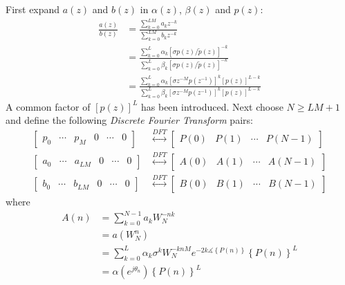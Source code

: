 \documentclass[a4paper,twoside,10pt,english]{report}
\begin{document}
First expand $a\left(z\right)$ and $b\left(z\right)$ in $\alpha\left(z\right)$,
$\beta\left(z\right)$ and $p\left(z\right)$:
\begin{align*}
\frac{a\left(z\right)}{b\left(z\right)} &= \frac{\sum_{k=0}^{LM}a_{k}z^{-k}}{\sum_{k=0}^{LM}b_{k}z^{-k}}\\
 &= \frac{\sum_{k=0}^{L}\alpha_{k}\left[\sigma p\left(z\right)/\tilde{p}\left(z\right)\right]^{-k}}{\sum_{k=0}^{L}\beta_{k}\left[\sigma p\left(z\right)/\tilde{p}\left(z\right)\right]^{-k}}\\
 &= \frac{\sum_{k=0}^{L}\alpha_{k}\left[\sigma z^{-M}p\left(z^{-1}\right)\right]^{k}\left[p\left(z\right)\right]^{L-k}}{\sum_{k=0}^{L}\beta_{k}\left[\sigma z^{-M}p\left(z^{-1}\right)\right]^{k}\left[p\left(z\right)\right]^{L-k}}
\end{align*}
A common factor of $\left[p\left(z\right)\right]^{L}$ has been introduced.
Next choose $N\geq LM+1$ and define the following 
\emph{Discrete Fourier Transform} pairs:
\begin{align*}
\left[\begin{array}{cccccc}
p_{0} & \cdots & p_{M} & 0 & \cdots & 0\end{array}\right] 
& \overset{DFT}{\longleftrightarrow}  \left[\begin{array}{cccc}
P\left(0\right) & P\left(1\right) & \cdots & P\left(N-1\right)\end{array}\right]\\
\left[\begin{array}{cccccc}
a_{0} & \cdots & a_{LM} & 0 & \cdots & 0\end{array}\right] 
& \overset{DFT}{\longleftrightarrow} \left[\begin{array}{cccc}
A\left(0\right) & A\left(1\right) & \cdots & A\left(N-1\right)\end{array}\right]\\
\left[\begin{array}{cccccc}
b_{0} & \cdots & b_{LM} & 0 & \cdots & 0\end{array}\right] 
& \overset{DFT}{\longleftrightarrow} \left[\begin{array}{cccc}
B\left(0\right) & B\left(1\right) & \cdots & B\left(N-1\right)\end{array}\right]
\end{align*}
where 
\begin{align*}
A\left(n\right) &= \sum_{k=0}^{N-1}a_{k}W_{N}^{-nk}\quad\\
 &= a\left(W_{N}^{n}\right)\\
 &= \sum_{k=0}^{L}\alpha_{k}\sigma^{k}W_{N}^{-knM}e^{-2k\measuredangle\left\{ P\left(n\right)\right\} }\left\{ P\left(n\right)\right\} ^{L}\\
 &= \alpha\left(e^{j\theta_{n}}\right)\left\{ P\left(n\right)\right\} ^{L}
\end{align*}
\end{document}
